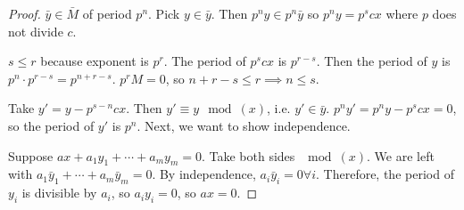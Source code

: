 \documentclass[a4paper,twoside,master.tex]{subfiles}
\begin{document}
\begin{proof}
    $ \bar{y} \in \bar{M} $ of period $ p^n $. Pick $ y \in \bar{y} $. Then $ p^n y \in p^n \bar{y} $ so $ p^n y = p^s c x $ where $ p $ does not divide $ c $. 

    $ s \leq r $ because exponent is $ p^r $. The period of $ p^s c x $ is $ p^{r-s} $. Then the period of $ y $ is $ p^n \cdot p^{r-s} = p^{n + r - s} $. $ p^r M = 0 $, so $ n + r - s \leq r \implies n \leq s $.

    Take $ y' = y - p^{s-n} c x $. Then $ y' \equiv y \mod (x) $, i.e. $ y' \in \bar{y} $. $ p^n y' = p^n y - p^s c x = 0 $, so the period of $ y' $ is $ p^n $. Next, we want to show independence.  

    Suppose $ a x + a_1 y_1 + \cdots + a_m y_m = 0 $. Take both sides $ \mod (x) $. We are left with $ a_1 \bar{y}_1 + \cdots + a_m \bar{y}_m = 0 $. By independence, $ a_i \bar{y}_i = 0 \forall i $. Therefore, the period of $ y_i $ is divisible by $ a_i $, so $ a_i y_i = 0 $, so $ a x = 0 $. 
\end{proof}
\end{document}
